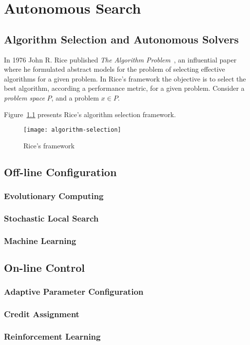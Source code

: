 \chapter{Autonomous Search}
\label{chap:autonomous}

\section{Algorithm Selection and Autonomous Solvers}
\label{sec:algselres}

In 1976 John R. Rice published \textit{The Algorithm
Problem}~\cite{rice1976algorithm}, an influential paper where he formulated
abstract models for the problem of selecting effective algorithms for a given
problem. In Rice's framework the objective is to select the best algorithm,
according a performance metric, for a given problem. Consider a \textit{problem
space} $P$, and a problem $x \in P$.

Figure~\ref{fig:riceframe} presents Rice's algorithm selection
framework.

\begin{figure}[htpb]
    \begin{center}
        \texttt{[image: algorithm-selection]}
    \end{center}
    \caption{Rice's framework}
    \label{fig:riceframe}
\end{figure}

\section{Off-line Configuration}
\label{sec:offconfig}

\subsection{Evolutionary Computing}
\label{subsec:evolcomp}

\subsection{Stochastic Local Search}
\label{subsec:searchsls}

\subsection{Machine Learning}
\label{subsec:searchml}

\section{On-line Control}
\label{sec:oncontrol}

\subsection{Adaptive Parameter Configuration}
\label{subsec:paramadaptive}

\subsection{Credit Assignment}
\label{subsec:creditassign}

\subsection{Reinforcement Learning}
\label{subsec:reinforce}
